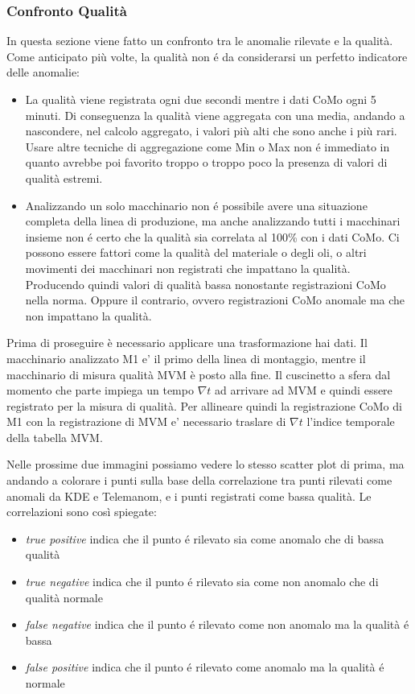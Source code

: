 \subsubsection{Confronto Qualità}
In questa sezione viene fatto un confronto tra le anomalie rilevate e la qualità. Come anticipato più volte, la qualità non é da considerarsi un perfetto indicatore delle anomalie: 
\begin{itemize}
	\item La qualità viene registrata ogni due secondi mentre i dati CoMo ogni 5 minuti. Di conseguenza la qualità viene aggregata con una media, andando a nascondere, nel calcolo aggregato, i valori più alti che sono anche i più rari. Usare altre tecniche di aggregazione come Min o Max non é immediato in quanto avrebbe poi favorito troppo o troppo poco la presenza di valori di qualità estremi.
	\item Analizzando un solo macchinario non é possibile avere una situazione completa della linea di produzione, ma anche analizzando tutti i macchinari insieme non é certo che la qualità sia correlata al 100\% con i dati CoMo. Ci possono essere fattori come la qualità del materiale o degli oli, o altri movimenti dei macchinari non registrati che impattano la qualità. Producendo quindi valori di qualità bassa nonostante registrazioni CoMo nella norma. Oppure il contrario, ovvero registrazioni CoMo anomale ma che non impattano la qualità.
\end{itemize}

Prima di proseguire è  necessario applicare una trasformazione hai dati. Il macchinario analizzato M1 e' il primo della linea di montaggio, mentre il macchinario di misura qualità MVM è  posto alla fine. Il cuscinetto a sfera dal momento che parte impiega un tempo ${\nabla}t$ ad arrivare ad MVM e quindi essere registrato per la misura di qualità. Per allineare quindi la registrazione CoMo di M1 con la registrazione di MVM e' necessario traslare di ${\nabla}t$ l'indice temporale della tabella MVM.

Nelle prossime due immagini possiamo vedere lo stesso scatter plot di prima, ma andando a colorare i punti sulla base della correlazione tra punti rilevati come anomali da KDE e Telemanom, e i punti registrati come bassa qualità. Le correlazioni sono così spiegate:
\begin{itemize}
	\item \textit{true positive} indica che il punto é rilevato sia come anomalo che di bassa qualità
	\item \textit{true negative} indica che il punto é rilevato sia come non anomalo che di qualità normale
	\item \textit{false negative} indica che il punto é rilevato come non anomalo ma la qualità é bassa
	\item \textit{false positive} indica che il punto é rilevato come anomalo ma la qualità é normale
\end{itemize}

